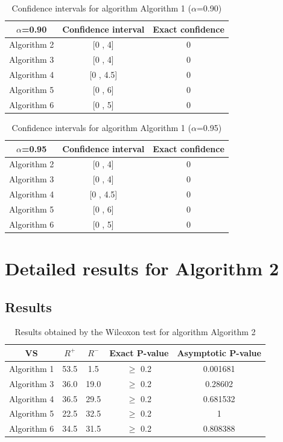 \documentclass[a4paper,10pt]{article}
\begin{document}
\begin{table}[!htp]
\centering\small
\begin{tabular}{
|c|c|c|}
\hline
 $\alpha$=0.90 & Confidence interval & Exact confidence \\ \hline 
Algorithm 2 & [0 , 4] & 0\\ \hline 
Algorithm 3 & [0 , 4] & 0\\ \hline 
Algorithm 4 & [0 , 4.5] & 0\\ \hline 
Algorithm 5 & [0 , 6] & 0\\ \hline 
Algorithm 6 & [0 , 5] & 0\\ \hline 

\end{tabular}
\caption{Confidence intervals for algorithm Algorithm 1 ($\alpha$=0.90)}
\end{table}
\begin{table}[!htp]
\centering\small
\begin{tabular}{
|c|c|c|}
\hline
 $\alpha$=0.95 & Confidence interval & Exact confidence \\ \hline 
Algorithm 2 & [0 , 4] & 0\\ \hline 
Algorithm 3 & [0 , 4] & 0\\ \hline 
Algorithm 4 & [0 , 4.5] & 0\\ \hline 
Algorithm 5 & [0 , 6] & 0\\ \hline 
Algorithm 6 & [0 , 5] & 0\\ \hline 

\end{tabular}
\caption{Confidence intervals for algorithm Algorithm 1 ($\alpha$=0.95)}
\end{table}

 \clearpage 


\section{Detailed results for Algorithm 2}


\subsection{Results}

\begin{table}[!htp]
\centering\small
\begin{tabular}{
|c|c|c|c|c|}
\hline
 VS & $R^{+}$ & $R^{-}$ & Exact P-value & Asymptotic P-value \\ \hline 
Algorithm 1 & 53.5 & 1.5 & $\geq$ 0.2 & 0.001681\\ \hline 
Algorithm 3 & 36.0 & 19.0 & $\geq$ 0.2 & 0.28602\\ \hline 
Algorithm 4 & 36.5 & 29.5 & $\geq$ 0.2 & 0.681532\\ \hline 
Algorithm 5 & 22.5 & 32.5 & $\geq$ 0.2 & 1\\ \hline 
Algorithm 6 & 34.5 & 31.5 & $\geq$ 0.2 & 0.808388\\ \hline 

\end{tabular}
\caption{Results obtained by the Wilcoxon test for algorithm Algorithm 2}
\end{table}
\end{document}
